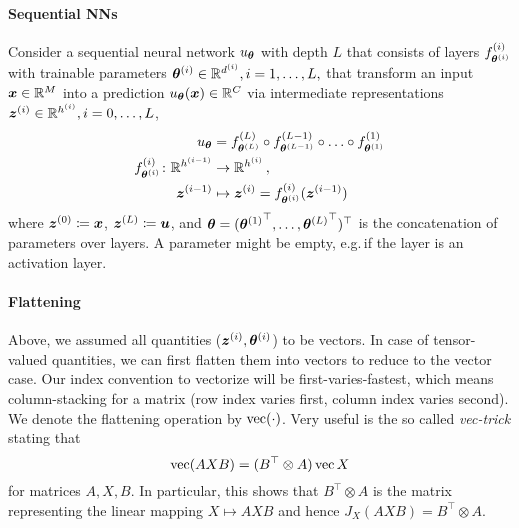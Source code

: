 \documentclass{article}
\begin{document}
\paragraph{Sequential NNs} Consider a sequential neural network $u_{{\bm{\theta}}}$ with depth $L$ that consists of layers $f^{(i)}_{{\bm{\theta}}^{(i)}}$ with trainable parameters ${\bm{\theta}}^{(i)} \in {\mathbb{R}}^{d^{(i)}}, i=1,\dots, L,$ that transform an input ${\bm{x}} \in {\mathbb{R}}^M$ into a prediction $u_{{\bm{\theta}}}({\bm{x}})\in {\mathbb{R}}^C$ via intermediate representations ${\bm{z}}^{(i)} \in {\mathbb{R}}^{h^{(i)}}, i= 0, \dots, L$,
\begin{align}
  \begin{split}
    u_{{\bm{\theta}}}
    &=
      f^{(L)}_{{\bm{\theta}}^{(L)}} \circ f^{(L-1)}_{{\bm{\theta}}^{(L-1)}} \circ \ldots \circ f^{(1)}_{{\bm{\theta}}^{(1)}}
    \\
    f^{(i)}_{{\bm{\theta}}^{(i)}}\colon {\mathbb{R}}^{h^{(i-1)}}
    &\to
      {\mathbb{R}}^{h^{(i)}}\,,
    \\
    {\bm{z}}^{(i-1)}
    &\mapsto
      {\bm{z}}^{(i)} = f^{(i)}_{{\bm{\theta}}^{(i)}}({\bm{z}}^{(i-1)})
  \end{split}
\end{align}
where ${\bm{z}}^{(0)} \coloneqq {\bm{x}}$, ${\bm{z}}^{(L)} \coloneqq {\bm{u}}$, and ${\bm{\theta}} = ({{\bm{\theta}}^{(1)}}^{\top}, \dots, {{\bm{\theta}}^{(L)}}^{\top})^{\top}$ is the concatenation of parameters over layers.
A parameter might be empty, e.g.\,if the layer is an activation layer.

\paragraph{Flattening} Above, we assumed all quantities (${\bm{z}}^{(i)}, {\bm{\theta}}^{(i)}$) to be vectors.
In case of tensor-valued quantities, we can first flatten them into vectors to reduce to the vector case.
Our index convention to vectorize will be first-varies-fastest, which means column-stacking for a matrix (row index varies first, column index varies second).
We denote the flattening operation by $\operatorname{vec}(\cdot)$.
Very useful is the so called \emph{vec-trick} stating that
\begin{equation}\label{eq:vecTrick}
  \operatorname{vec}(AXB) = (B^\top\otimes A)\operatorname{vec}{X}
\end{equation}
for matrices $A, X, B$. In particular, this shows that $B^\top\otimes A$ is the  matrix representing the linear mapping $X\mapsto AXB$ and hence $J_X(AXB) = B^\top\otimes A$.
\end{document}
